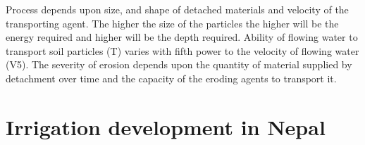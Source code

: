 \documentclass[
  openany]{book}
\begin{document}
Process depends upon size, and shape of detached materials and velocity of the transporting agent. The higher the size of the particles the higher will be the energy required and higher will be the depth required. Ability of flowing water to transport soil particles (T) varies with fifth power to the velocity of flowing water (V5). The severity of erosion depends upon the quantity of material supplied by detachment over time and the capacity of the eroding agents to transport it.

\hypertarget{irrigation-development-in-nepal}{%
\section{Irrigation development in Nepal}\label{irrigation-development-in-nepal}}

\end{document}
